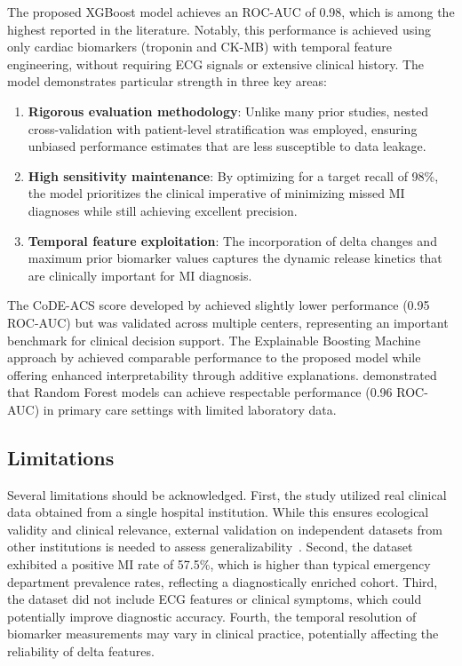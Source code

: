\documentclass[fleqn,10pt,lineno]{wlpeerj}
\begin{document}
The proposed XGBoost model achieves an ROC-AUC of 0.98, which is among the highest reported in the literature. Notably, this performance is achieved using only cardiac biomarkers (troponin and CK-MB) with temporal feature engineering, without requiring ECG signals or extensive clinical history. The model demonstrates particular strength in three key areas:
\begin{enumerate}[noitemsep]
\item \textbf{Rigorous evaluation methodology}: Unlike many prior studies, nested cross-validation with patient-level stratification was employed, ensuring unbiased performance estimates that are less susceptible to data leakage.
\item \textbf{High sensitivity maintenance}: By optimizing for a target recall of 98\%, the model prioritizes the clinical imperative of minimizing missed MI diagnoses while still achieving excellent precision.
\item \textbf{Temporal feature exploitation}: The incorporation of delta changes and maximum prior biomarker values captures the dynamic release kinetics that are clinically important for MI diagnosis.
\end{enumerate}

The CoDE-ACS score developed by \citet{Doudesis2023} achieved slightly lower performance (0.95 ROC-AUC) but was validated across multiple centers, representing an important benchmark for clinical decision support. The Explainable Boosting Machine approach by \citet{Kucukakcali2025} achieved comparable performance to the proposed model while offering enhanced interpretability through additive explanations. \citet{Salet2024} demonstrated that Random Forest models can achieve respectable performance (0.96 ROC-AUC) in primary care settings with limited laboratory data.

\subsection*{Limitations}

Several limitations should be acknowledged. First, the study utilized real clinical data obtained from a single hospital institution. While this ensures ecological validity and clinical relevance, external validation on independent datasets from other institutions is needed to assess generalizability~\citep{Johnson2023}. Second, the dataset exhibited a positive MI rate of 57.5\%, which is higher than typical emergency department prevalence rates, reflecting a diagnostically enriched cohort. Third, the dataset did not include ECG features or clinical symptoms, which could potentially improve diagnostic accuracy. Fourth, the temporal resolution of biomarker measurements may vary in clinical practice, potentially affecting the reliability of delta features.
\end{document}
